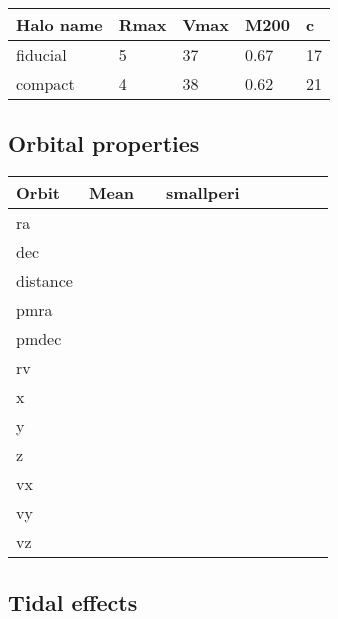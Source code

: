 \begin{table*}[t]
\centering
\begin{tabular}{lllll}
\toprule
Halo name & Rmax & Vmax & M200 & c\\
\midrule
fiducial & 5 & 37 & 0.67 & 17\\
compact & 4 & 38 & 0.62 & 21\\
\bottomrule
\end{tabular}
\end{table*}

\subsection{Orbital properties}\label{orbital-properties-1}

\begin{table*}[t]
\centering
\begin{tabular}{lllllllll}
\toprule
Orbit & Mean &  & smallperi &  &  &  &  & \\
\midrule
ra &  &  &  &  &  &  &  & \\
dec &  &  &  &  &  &  &  & \\
distance &  &  &  &  &  &  &  & \\
pmra &  &  &  &  &  &  &  & \\
pmdec &  &  &  &  &  &  &  & \\
rv &  &  &  &  &  &  &  & \\
x &  &  &  &  &  &  &  & \\
y &  &  &  &  &  &  &  & \\
z &  &  &  &  &  &  &  & \\
vx &  &  &  &  &  &  &  & \\
vy &  &  &  &  &  &  &  & \\
vz &  &  &  &  &  &  &  & \\
\bottomrule
\end{tabular}
\end{table*}

\subsection{Tidal effects}\label{tidal-effects-2}
